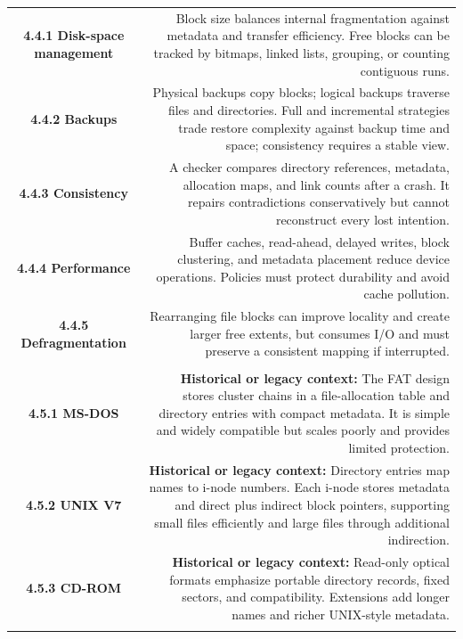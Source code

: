 \documentclass[10pt,letterpaper]{article}
\begin{document}
\begin{longtable}{C N}
\\*\hline
\textbf{4.4.1 Disk-space management} & Block size balances internal fragmentation against metadata and transfer efficiency. Free blocks can be tracked by bitmaps, linked lists, grouping, or counting contiguous runs.\\\hline
\textbf{4.4.2 Backups} & Physical backups copy blocks; logical backups traverse files and directories. Full and incremental strategies trade restore complexity against backup time and space; consistency requires a stable view.\\\hline
\textbf{4.4.3 Consistency} & A checker compares directory references, metadata, allocation maps, and link counts after a crash. It repairs contradictions conservatively but cannot reconstruct every lost intention.\\\hline
\textbf{4.4.4 Performance} & Buffer caches, read-ahead, delayed writes, block clustering, and metadata placement reduce device operations. Policies must protect durability and avoid cache pollution.\\\hline
\textbf{4.4.5 Defragmentation} & Rearranging file blocks can improve locality and create larger free extents, but consumes I/O and must preserve a consistent mapping if interrupted.\\\hline
{}\\*\hline
\textbf{4.5.1 MS-DOS} & \textcolor{legacy}{\textbf{Historical or legacy context:}} The FAT design stores cluster chains in a file-allocation table and directory entries with compact metadata. It is simple and widely compatible but scales poorly and provides limited protection.\\\hline
\textbf{4.5.2 UNIX V7} & \textcolor{legacy}{\textbf{Historical or legacy context:}} Directory entries map names to i-node numbers. Each i-node stores metadata and direct plus indirect block pointers, supporting small files efficiently and large files through additional indirection.\\\hline
\textbf{4.5.3 CD-ROM} & \textcolor{legacy}{\textbf{Historical or legacy context:}} Read-only optical formats emphasize portable directory records, fixed sectors, and compatibility. Extensions add longer names and richer UNIX-style metadata.\\\hline
{}\\*\hline

\end{longtable}
\end{document}
